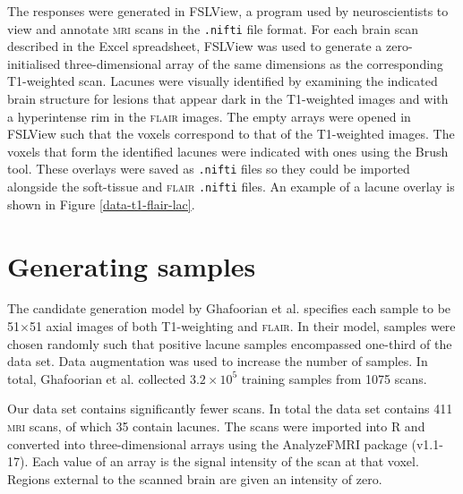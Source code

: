 The responses were generated in FSLView, a program used by neuroscientists to view and annotate \textsc{mri} scans in the \texttt{.nifti} file format. For each brain scan described in the Excel spreadsheet, FSLView was used to generate a zero-initialised three-dimensional array of the same dimensions as the corresponding T1-weighted scan. Lacunes were visually identified by examining the indicated brain structure for lesions that appear dark in the T1-weighted images and with a hyperintense rim in the \textsc{flair} images. The empty arrays were opened in FSLView such that the voxels correspond to that of the T1-weighted images. The voxels that form the identified lacunes were indicated with ones using the Brush tool. These overlays were saved as \texttt{.nifti} files so they could be imported alongside the soft-tissue and \textsc{flair} \texttt{.nifti} files. An example of a lacune overlay is shown in Figure \ref{data-t1-flair-lac}.




\section{Generating samples}\label{data-samples}

The candidate generation model by Ghafoorian et al. \cite{GhafoorianM.2017Dml3} specifies each sample to be 51$\times$51 axial images of both T1-weighting and \textsc{flair}. In their model, samples were chosen randomly such that positive lacune samples encompassed one-third of the data set. Data augmentation was used to increase the number of samples. In total, Ghafoorian et al. collected $3.2\times10^5$ training samples from 1075 scans.

Our data set contains significantly fewer scans. In total the data set contains 411 \textsc{mri} scans, of which 35 contain lacunes. The scans were imported into R and converted into three-dimensional arrays using the AnalyzeFMRI package (v1.1-17). Each value of an array is the signal intensity of the scan at that voxel. Regions external to the scanned brain are given an intensity of zero.

